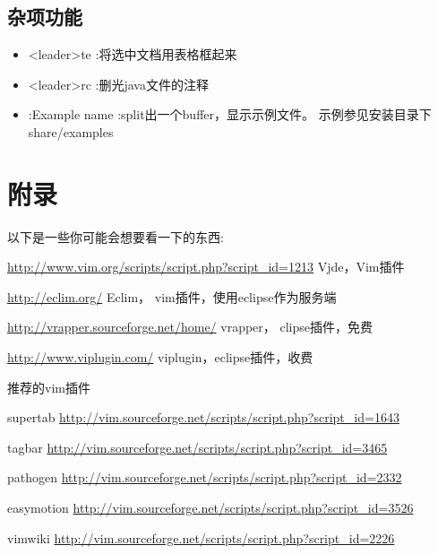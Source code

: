 \documentclass[oneside,openany]{book}
\begin{document}
\section{杂项功能}
  \begin{itemize}
        \item <leader>te  :将选中文档用表格框起来
        \item <leader>rc  :删光java文件的注释
        \item :Example name  :split出一个buffer，显示示例文件。 示例参见安装目录下share/examples
  \end{itemize}
    

\chapter{附录}
  以下是一些你可能会想要看一下的东西:
  \newline

  \href{http://www.vim.org/scripts/script.php?script\_id=1213}{http://www.vim.org/scripts/script.php?script\_id=1213} 
  Vjde，Vim插件
  \newline

  \href{http://eclim.org/}{http://eclim.org/} Eclim， vim插件，使用eclipse作为服务端
  \newline

  \href{http://vrapper.sourceforge.net/home/}{http://vrapper.sourceforge.net/home/}
  vrapper， clipse插件，免费
  \newline

  \href{http://www.viplugin.com/}{http://www.viplugin.com/}
  viplugin，eclipse插件，收费
  \newline

  推荐的vim插件

  supertab
  \href{http://vim.sourceforge.net/scripts/script.php?script\_id=1643}
   {http://vim.sourceforge.net/scripts/script.php?script\_id=1643}

  tagbar
  \href{http://vim.sourceforge.net/scripts/script.php?script\_id=3465}
   {http://vim.sourceforge.net/scripts/script.php?script\_id=3465}

  pathogen
  \href{http://vim.sourceforge.net/scripts/script.php?script\_id=2332}
   {http://vim.sourceforge.net/scripts/script.php?script\_id=2332}

  easymotion
  \href{http://vim.sourceforge.net/scripts/script.php?script\_id=3526}
   {http://vim.sourceforge.net/scripts/script.php?script\_id=3526}

  vimwiki
  \href{http://vim.sourceforge.net/scripts/script.php?script\_id=2226}
   {http://vim.sourceforge.net/scripts/script.php?script\_id=2226}
\end{document}
